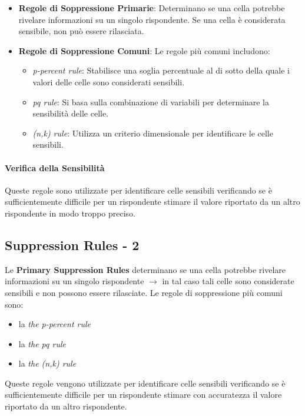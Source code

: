 \documentclass{report}
\begin{document}
\begin{itemize}
    \item \textbf{Regole di Soppressione Primarie}: Determinano se una cella potrebbe rivelare informazioni su un singolo rispondente. Se una cella è considerata sensibile, non può essere rilasciata.
    \item \textbf{Regole di Soppressione Comuni}: Le regole più comuni includono:
    \begin{itemize}
        \item \textit{p-percent rule}: Stabilisce una soglia percentuale al di sotto della quale i valori delle celle sono considerati sensibili.
        \item \textit{pq rule}: Si basa sulla combinazione di variabili per determinare la sensibilità delle celle.
        \item \textit{(n,k) rule}: Utilizza un criterio dimensionale per identificare le celle sensibili.
    \end{itemize}
\end{itemize}

\paragraph{Verifica della Sensibilità}
Queste regole sono utilizzate per identificare celle sensibili verificando se è sufficientemente difficile per un rispondente stimare il valore riportato da un altro rispondente in modo troppo preciso.

\subsection{Suppression Rules - 2}
Le \textbf{Primary Suppression Rules} determinano se una cella potrebbe rivelare informazioni su un singolo rispondente $\rightarrow$ in tal caso tali celle sono considerate sensibili e non possono essere rilasciate.
Le regole di soppressione più comuni sono:
    \begin{itemize}
        \item la \textit{the p-percent rule}
        \item la \textit{the pq rule}
        \item la \textit{the (n,k) rule}
    \end{itemize}
Queste regole vengono utilizzate per identificare celle sensibili verificando se è sufficientemente difficile per un rispondente stimare con accuratezza il valore riportato da un altro rispondente.
\end{document}

